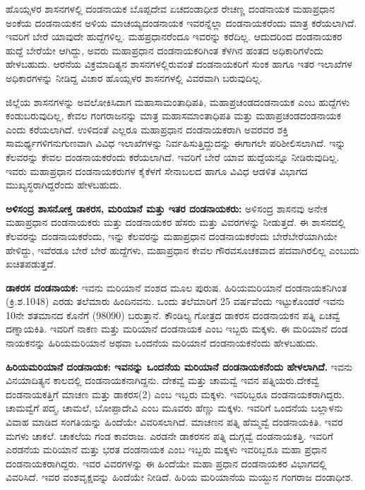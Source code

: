 ಹೊಯ್ಸಳರ ಶಾಸನಗಳಲ್ಲಿ ದಂಡನಾಯಕ ಬೊಪ್ಪದೇವ ಏಚದಂಡಾಧೀಶ ರೇಚಣ್ಣ ದಂಡನಾಯಕ ಮಹಾಪ್ರಧಾನ ಅಂಕೆಯ ದಂಡನಾಯಕನ ಅಳಿಯ ಮಾಚಯ್ಯದಂಡನಾಯಕ ಇವರನ್ನೆಲ್ಲಾ ದಂಡನಾಯಕರೆಂದು ಮಾತ್ರ ಕರೆಯಲಾಗಿದೆ. ಇವರಿಗೆ ಬೇರೆ ಯಾವುದೇ ಹುದ್ದೆಗಳಿಲ್ಲ. ಮಹಪ್ರಧಾನರೆಂದೂ ಇವರನ್ನು ಕರೆದಿಲ್ಲ. ಆದುದರಿಂದ ದಂಡನಾಯಕರ ಹುದ್ದೆ ಬೇರೆಯೇ ಆಗಿದ್ದು, ಅವರು ಮಹಾಪ್ರಧಾನ ದಂಡನಾಯಕರಿಗಿಂತ ಕೆಳಗಿನ ಹಂತದ ಅಧಿಕಾರಿಗಳೆಂದು ಹೇಳಬಹುದು. ಆರನೆಯ ವಿಕ್ರಮಾದಿತ್ಯನ ಶಾಸನಗಳಲ್ಲಿರುವಂತೆ ದಂಡನಾಯಕರಿಗೆ ಸುಂಕ ಹಾಗೂ ಇತರ ಇಲಾಖೆಗಳ ಅಧಿಕಾರಗಳನ್ನು ನೀಡಿದ್ದ ವಿಚಾರ ಹೊಯ್ಸಳರ ಶಾಸನಗಳಲ್ಲಿ ವಿವರವಾಗಿ ಬರುವುದಿಲ್ಲ.

ಜಿಲ್ಲೆಯ ಶಾಸನಗಳನ್ನು ಅವಲೋಕಿಸಿದಾಗ ಮಹಾಸಾಮಂತಾಧಿಪತಿ, ಮಹಾಪ್ರಚಂಡದಂಡನಾಯಕ ಎಂಬ ಹುದ್ದೆ\-ಗಳು ಕಂಡುಬರುವುದಿಲ್ಲ, ಕೇವಲ ಗಂಗರಾಜನನ್ನು ಮಾತ್ರ ಮಹಾಸಮಾಂತಾಧಿಪತಿ ಮತ್ತು ಮಹಾಪ್ರಚಂಡದಂಡನಾಯಕ ಎಂದು ಕರೆಯಲಾಗಿದೆ. ಉಳಿದಂತೆ ಎಲ್ಲರೂ ಮಹಾಪ್ರಧಾನ ದಂಡನಾಯಕರಾಗಿ ಅವರವರ ಶಕ್ತಿ ಸಾಮರ್ಥ್ಯಗಳಿಗನುಗುಣವಾಗಿ ವಿವಿಧ ಇಲಾಖೆಗಳನ್ನು ನಿರ್ವಹಿಸುತ್ತಿದ್ದುದನ್ನು ಈಗಾಗಲೇ ಪರಿಶೀಲಿಸಲಾಗಿದೆ. ಇನ್ನು ಕೆಲವರನ್ನು ಕೇವಲ ದಂಡನಾಯಕರೆಂದು ಕರೆಯಲಾಗಿದೆ. ಇವರಿಗೆ ಬೇರೆ ಯಾವ ಹುದ್ದೆಯನ್ನೂ ನೀಡಿರುವುದಿಲ್ಲ. ಇವರು ಮಹಾಪ್ರಧಾನ ದಂಡನಾಯಕರುಗಳ ಕೈಕೆಳಗೆ ಸೇನಾಬಲದ ಹಾಗೂ ವಿವಿಧ ಆಡಳಿತ ವಿಭಾಗದ ಮುಖ್ಯಸ್ಥರಾಗಿದ್ದರೆಂದು ಹೇಳಬಹುದು.

\textbf{ಅಳಿಸಂದ್ರ ಶಾಸನೋಕ್ತ ಡಾಕರಸ, ಮರಿಯಾನೆ ಮತ್ತು ಇತರ ದಂಡನಾಯಕರು:} ಅಳಿಸಂದ್ರ ಶಾಸನವು ಅನೇಕ ಮಹಾಪ್ರಧಾನ ದಂಡನಾಯಕರು ಮತ್ತು ದಂಡನಾಯಕರ ಹೆಸರು ಮತ್ತು ವಿವರಗಳನ್ನು ನೀಡುತ್ತದೆ. ಈ ಶಾಸನದಲ್ಲಿ ಕೆಲವರನ್ನು ದಂಡನಾಯಕರೆಂದು, ಇನ್ನು ಕೆಲವರನ್ನು ಮಹಾಪ್ರಧಾನ ದಂಡನಾಯಕರೆಂದು ಬೇರೆಬೇರೆಯಾಗಿಯೇ ಹೇಳಿದ್ದು, ಇವೆರಡೂ ಬೇರೆ ಬೇರೆ ಹುದ್ದೆಗಳು, ಮಹಾಪ್ರಧಾನ ಕೇವಲ ಗೌರವಸೂಚಕವಾದ ಪದವಾಗಿರಲಿಲ್ಲ ಎಂಬುದು ಖಚಿತಪಡುತ್ತದೆ.

\textbf{ಡಾಕರಸ ದಂಡನಾಯಕ:} ಇವನು ಮರಿಯಾನೆ ವಂಶದ ಮೂಲ ಪುರುಷ. ಹಿರಿಯಮರಿಯಾನೆ ದಂಡನಾಯಕನಿಗಿಂತ (ಕ್ರಿ.ಶ.1048) ಎರಡು ತಲೆಮಾರು ಹಿಂದಿನವನು. ಒಂದು ತಲೆಮಾರಿಗೆ 25 ವರ್ಷವೆಂದು ಇಟ್ಟುಕೊಂಡರೆ ಇವನು 10ನೇ ಶತಮಾನದ ಕೊನೆಗೆ (980\enginline{-}90) ಬರುತ್ತಾನೆ. ಕೌಂಡಿಲ್ಯ ಗೋತ್ರದ ಡಾಕರಸ ದಂಡನಾಯಕನ ಪತ್ನಿ ಏಚವ್ವೆ ದಣ್ನಾಯಕಿತಿ. ಇವರಿಗೆ ನಾಕಣ ಮತ್ತು ಮರಿಯಾನೆ ದಂಡನಾಯಕ ಎಂಬ ಇಬ್ಬರು ಮಕ್ಕಳು. ಈ ಮರಿಯಾನೆ ದಂಡ ನಾಯಕನನ್ನು ಹಿರಿಯಮರಿಯಾನೆ ಅಥವಾ ಒಂದನೆಯ ಮರಿಯಾನೆ ದಂಡನಾಯಕನೆಂದು ಹೇಳಬಹುದು.

\textbf{ಹಿರಿಯಮರಿಯಾನೆ ದಂಡನಾಯಕ: ಇವನನ್ನು ಒಂದನೆಯ ಮರಿಯಾನೆ ದಂಡನಾಯಕನೆಂದು ಹೇಳಲಾಗಿದೆ. }ಇವನು ವಿನಯಾದಿತ್ಯನ ಕಾಲದಲ್ಲಿ ದಂಡನಾಯಕನಾಗಿದ್ದನು. ದೇಕವ್ವೆ ಮತ್ತು ಚಾಮವ್ವೆ ಇವನ ಪತ್ನಿಯರು.\break ದೇಕವ್ವೆ ದಂಡನಾಯಕತ್ತಿಗೆ ಮಾಚಣ ಮತ್ತು ಡಾಕರಸ(2) ಎಂಬ ಇಬ್ಬರು ಮಕ್ಕಳು. ಇವರಿಬ್ಬರೂ ದಂಡನಾಯಕರಾಗಿದ್ದರು. ಚಾಮವ್ವೆಗೆ ಪದ್ಮ, ಚಾಮಲೆ, ಬೋಪ್ಪಾದೇವಿ ಎಂಬ ಮೂವರು ಹೆಣ್ಣು ಮಕ್ಕಳು. ಇವರಿಗೆ ಒಂದನೆಯ ಬಲ್ಲಾಳನು ವಿವಾಹ ಮಾಡಿದ ಸಂಗತಿಯನ್ನು ಹಿಂದೆಯೇ ವಿವರಿಸಲಾಗಿದೆ. ಮಾಚಣನ ಪತ್ನಿ ಹೆಮ್ಮವ್ವೆ ದಂಡನಾಯಕಿತಿ. ಇವರ ಮಗಳು ಚಾಕಲೆ. ಚಾಕಲೆಯ ಗಂಡ ಕಾವರಾಜ. ಎರಡನೇ ಡಾಕರಸನ ಪತ್ನಿ ದುಗ್ಗವ್ವೆ ದಂಡನಾಯಕತ್ತಿ. ಇವರಿಗೆ ಎರಡನೆಯ ಮರಿಯಾನೆ ಮತ್ತು ಭರತ ದಂಡನಾಯಕ ಎಂಬ ಇಬ್ಬರು ಮಕ್ಕಳು ಇವರಿಬ್ಬರೂ ಮಹಾ ಪ್ರಧಾನ ದಂಡನಾಯಕರಾಗಿದ್ದರು. ಇವರ ವಿವರಗಳನ್ನು ಈ ಹಿಂದೆಯೇ ಮಹಾ ಪ್ರಧಾನ ದಂಡನಾಯಕರ ವಿಭಾಗದಲ್ಲಿ ವಿವರಿಸಿದೆ. ಇವರ ವಂಶವೃಕ್ಷವನ್ನು ಹಿಂದೆಯೇ ನೀಡಿದೆ. ಹಿರಿಯ ಮರಿಯಾನೆಯ ಮಯ್ದುನ ಗಂಗರಾಜ ದಂಡಾಧೀಶ.

